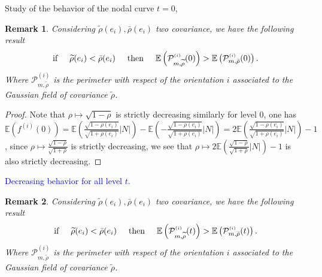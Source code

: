 \documentclass[12pt]{article}
\renewcommand{\tilde}{\widetilde}
\theoremstyle{Theorem}
\newtheorem{remark}{Remark}
\begin{document}
Study of the behavior of the nodal curve $t = 0$, 
\begin{remark}
\label{decreasingrho}
Considering $\tilde{\rho}(e_i), \bar{\rho}(e_i)$ two covariance, we  have the following result 
\begin{equation*}
 \text{if} \hspace{0.5cm} \tilde{\rho}(e_i) < \bar{\rho}(e_i) \hspace{0.5cm} \text{then} \hspace{0.5cm}\mathbb{E}\left(\mathcal{P}^{\scriptscriptstyle (i)}_{m, \tilde{\rho}}(0)\right) > \mathbb{E}\left(\mathcal{P}^{\scriptscriptstyle (i)}_{m, \bar{\rho}}(0)\right).
\end{equation*}
Where $\mathcal{P}^{\scriptscriptstyle (i)}_{m, \tilde{\rho}}$ is the perimeter with respect of the orientation $i$ associated to the Gaussian field of covariance $\tilde{\rho}$. 
\end{remark}
\begin{proof}
Note that $\rho \mapsto \sqrt{1-\rho}$ is strictly decreasing similarly  for level $0$, one has $\mathbb{E}\left(f^{(i)}(0)\right) = \mathbb{E}\left(\frac{\sqrt{1-\rho(e_i)}}{\sqrt{1+\rho(e_i)}}|N|\right) - \mathbb{E}\left(-\frac{\sqrt{1-\rho(e_i)}}{\sqrt{1+\rho(e_i)}}|N|\right) = 2\mathbb{E}\left(\frac{\sqrt{1-\rho(e_i)}}{\sqrt{1+\rho(e_i)}}|N|\right) - 1$, since $\rho \mapsto \frac{\sqrt{1-\rho}}{\sqrt{1+\rho}}$ is strictly decreasing, we see that $\rho \mapsto 2\mathbb{E}\left(\frac{\sqrt{1-\rho}}{\sqrt{1+\rho}}|N|\right) - 1 $ is also strictly decreasing. 
\end{proof}
\textcolor{blue}{Decreasing behavior for all level $t$.}
\begin{remark}
Considering $\tilde{\rho}(e_i), \bar{\rho}(e_i)$ two covariance, we  have the following result 
\begin{equation*}
 \text{if} \hspace{0.5cm} \tilde{\rho}(e_i) < \bar{\rho}(e_i) \hspace{0.5cm} \text{then} \hspace{0.5cm}\mathbb{E}\left(\mathcal{P}^{\scriptscriptstyle (i)}_{m, \tilde{\rho}}(t)\right) > \mathbb{E}\left(\mathcal{P}^{\scriptscriptstyle (i)}_{m, \bar{\rho}}(t)\right).
\end{equation*}
Where $\mathcal{P}^{\scriptscriptstyle (i)}_{m, \tilde{\rho}}$ is the perimeter with respect of the orientation $i$ associated to the Gaussian field of covariance $\tilde{\rho}$. 
\end{remark}
\end{document}
